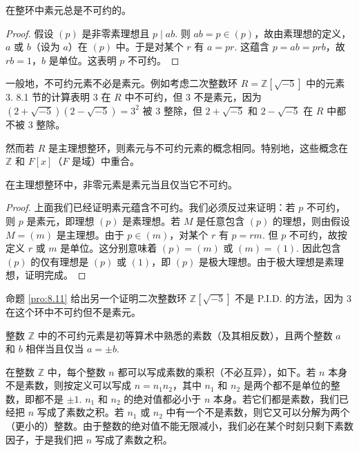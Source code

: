 \begin{proposition}\label{pro:8.10}
在整环中素元总是不可约的。
\end{proposition}

\begin{proof}
假设 \((p)\) 是非零素理想且 \(p \mid ab\). 则 \(ab = p \in (p)\)，故由素理想的定义，\(a\) 或 \(b\)（设为 \(a\)）在 \((p)\) 中。于是对某个 \(r\) 有 \(a = pr\). 这蕴含 \(p = ab = prb\)，故 \(rb = 1\)，\(b\) 是单位。这表明 \(p\) 不可约。
\end{proof}

一般地，不可约元素不必是素元。例如考虑二次整数环 \(R = \mathbb{Z}[\sqrt{-5}]\) 中的元素 3. 8.1 节的计算表明 3 在 \(R\) 中不可约，但 3 不是素元，因为 \((2+\sqrt{-5})(2-\sqrt{-5}) = 3^2\) 被 3 整除，但 \(2+\sqrt{-5}\) 和 \(2-\sqrt{-5}\) 在 \(R\) 中都不被 3 整除。

然而若 \(R\) 是主理想整环，则素元与不可约元素的概念相同。特别地，这些概念在 \(\mathbb{Z}\) 和 \(F[x]\)（\(F\) 是域）中重合。

\begin{proposition}\label{pro:8.11}
在主理想整环中，非零元素是素元当且仅当它不可约。
\end{proposition}

\begin{proof}
上面我们已经证明素元蕴含不可约。我们必须反过来证明：若 \(p\) 不可约，则 \(p\) 是素元，即理想 \((p)\) 是素理想。若 \(M\) 是任意包含 \((p)\) 的理想，则由假设 \(M = (m)\) 是主理想。由于 \(p \in (m)\)，对某个 \(r\) 有 \(p = rm\). 但 \(p\) 不可约，故按定义 \(r\) 或 \(m\) 是单位。这分别意味着 \((p) = (m)\) 或 \((m) = (1)\). 因此包含 \((p)\) 的仅有理想是 \((p)\) 或 \((1)\)，即 \((p)\) 是极大理想。由于极大理想是素理想，证明完成。
\end{proof}

\begin{example}
命题 \ref{pro:8.11} 给出另一个证明二次整数环 \(\mathbb{Z}[\sqrt{-5}]\) 不是 P.I.D. 的方法，因为 3 在这个环中不可约但不是素元。
\end{example}

整数 \(\mathbb{Z}\) 中的不可约元素是初等算术中熟悉的素数（及其相反数），且两个整数 \(a\) 和 \(b\) 相伴当且仅当 \(a = \pm b\).

在整数 \(\mathbb{Z}\) 中，每个整数 \(n\) 都可以写成素数的乘积（不必互异），如下。若 \(n\) 本身不是素数，则按定义可以写成 \(n = n_1n_2\)，其中 \(n_1\) 和 \(n_2\) 是两个都不是单位的整数，即都不是 \(\pm 1\). \(n_1\) 和 \(n_2\) 的绝对值都必小于 \(n\) 本身。若它们都是素数，我们已经把 \(n\) 写成了素数之积。若 \(n_1\) 或 \(n_2\) 中有一个不是素数，则它又可以分解为两个（更小的）整数。由于整数的绝对值不能无限减小，我们必在某个时刻只剩下素数因子，于是我们把 \(n\) 写成了素数之积。

